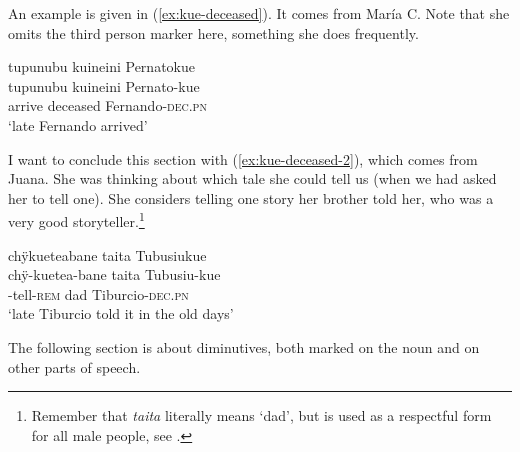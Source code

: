 An example is given in (\ref{ex:kue-deceased}). It comes from María C. Note that she omits the third person marker here, something she does frequently.

\ea\label{ex:kue-deceased}
\begingl 
\glpreamble tupunubu kuineini Pernatokue\\
\gla tupunubu kuineini Pernato-kue\\ 
\glb arrive deceased Fernando-\textsc{dec.pn}\\ 
\glft ‘late Fernando arrived’\\ 
\endgl
\trailingcitation{[ump-p110815sf.412]}
\xe

I want to conclude this section with (\ref{ex:kue-deceased-2}), which comes from Juana. She was thinking about which tale she could tell us (when we had asked her to tell one). She considers telling one story her brother told her, who was a very good storyteller.\footnote{Remember that \textit{taita} literally means ‘dad’, but is used as a respectful form for all male people, see .}

\ea\label{ex:kue-deceased-2}
\begingl
\glpreamble chÿkueteabane taita Tubusiukue\\
\gla chÿ-kuetea-bane taita Tubusiu-kue\\
-tell-\textsc{rem} dad Tiburcio-\textsc{dec.pn}\\
\glft ‘late Tiburcio told it in the old days’
\endgl
\trailingcitation{[jmx-n120429ls-x5.038]}
\xe
{}

The following section is about diminutives, both marked on the noun and on other parts of speech.

